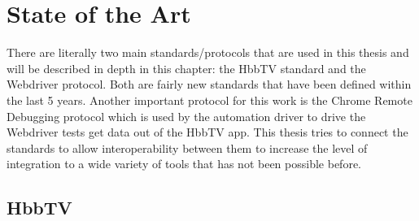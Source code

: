 %
%

\chapter{State of the Art\label{cha:state_of_the_art}}

There are literally two main standards/protocols that are used in this thesis and will be described in
depth in this chapter: the HbbTV standard and the Webdriver protocol. Both are fairly new standards that
have been defined within the last 5 years. Another important protocol for this work is the Chrome Remote
Debugging protocol which is used by the automation driver to drive the Webdriver tests get data out of
the HbbTV app. This thesis tries to connect the standards to allow interoperability between them to
increase the level of integration to a wide variety of tools that has not been possible before.

\section{HbbTV\label{sec:hbbtv}}


